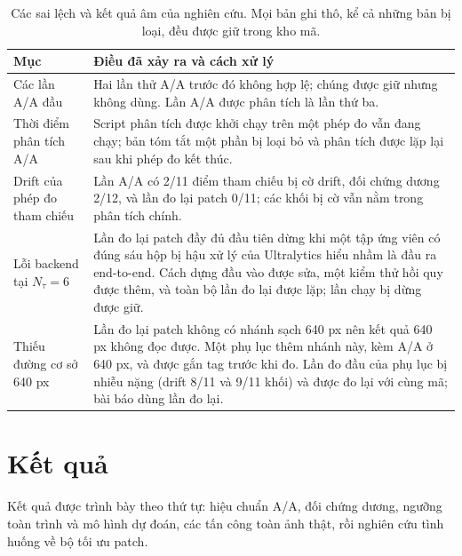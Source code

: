 \documentclass[a4paper,fleqn]{cas-dc}
\newcommand{\Ntau}{N_{\tau}}
\begin{document}
\begin{table}[!tp]
\centering\small
\caption{Các sai lệch và kết quả âm của nghiên cứu. Mọi bản ghi thô, kể cả những bản bị loại, đều được giữ trong kho mã.}
\label{tab:dev}
\begin{tabularx}{\textwidth}{@{}lX@{}}
\toprule
Mục & Điều đã xảy ra và cách xử lý \\
\midrule
Các lần A/A đầu & Hai lần thử A/A trước đó không hợp lệ; chúng được giữ nhưng không dùng. Lần A/A được phân tích là lần thứ ba. \\
Thời điểm phân tích A/A & Script phân tích được khởi chạy trên một phép đo vẫn đang chạy; bản tóm tắt một phần bị loại bỏ và phân tích được lặp lại sau khi phép đo kết thúc. \\
Drift của phép đo tham chiếu & Lần A/A có 2/11 điểm tham chiếu bị cờ drift, đối chứng dương 2/12, và lần đo lại patch 0/11; các khối bị cờ vẫn nằm trong phân tích chính. \\
Lỗi backend tại $\Ntau=6$ & Lần đo lại patch đầy đủ đầu tiên dừng khi một tập ứng viên có đúng sáu hộp bị hậu xử lý của Ultralytics hiểu nhầm là đầu ra end-to-end. Cách dựng đầu vào được sửa, một kiểm thử hồi quy được thêm, và toàn bộ lần đo lại được lặp; lần chạy bị dừng được giữ. \\
Thiếu đường cơ sở 640 px & Lần đo lại patch không có nhánh sạch 640 px nên kết quả 640 px không đọc được. Một phụ lục thêm nhánh này, kèm A/A ở 640 px, và được gắn tag trước khi đo. Lần đo đầu của phụ lục bị nhiễu nặng (drift 8/11 và 9/11 khối) và được đo lại với cùng mã; bài báo dùng lần đo lại. \\
\bottomrule
\end{tabularx}
\end{table}


\section{Kết quả}
\label{sec:results}
Kết quả được trình bày theo thứ tự: hiệu chuẩn A/A, đối chứng dương, ngưỡng toàn trình và mô hình dự đoán, các tấn công toàn ảnh thật, rồi nghiên cứu tình huống về bộ tối ưu patch.
\end{document}

